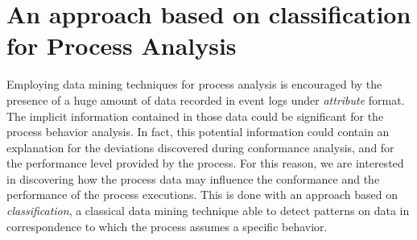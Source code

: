 \documentclass{llncs}
\begin{document}

\section{An approach based on classification for Process Analysis}\label{ClassifApproach}
Employing data mining techniques for process analysis is encouraged by the presence of a huge amount of data recorded in event logs under \emph{attribute} format. The implicit information contained in those data could be significant for the process behavior analysis. In fact, this potential information could contain an explanation for the deviations discovered during conformance analysis, and for the performance level provided by the process. For this reason, we are interested in discovering how the process data may influence the conformance and the performance of the process executions. This is done with an approach based on \emph{classification}, a classical data mining technique able to detect patterns on data in correspondence to which the process assumes a specific behavior.
\end{document}
